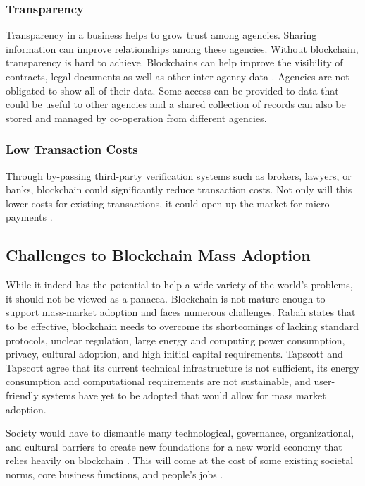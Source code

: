 \documentclass[sigconf]{acmart}
\begin{document}
\subsubsection{Transparency} Transparency in a business helps to grow trust among agencies. Sharing information can improve relationships among these agencies. Without blockchain, transparency is hard to achieve. Blockchains can help improve the visibility of contracts, legal documents as well as other inter-agency data \cite{pabc1}. Agencies are not obligated to show all of their data. Some access can be provided to data that could be useful to other agencies and a shared collection of records can also be stored and managed by co-operation from different agencies.

\subsubsection{Low Transaction Costs} Through by-passing third-party verification systems such as brokers, lawyers, or banks, blockchain could significantly reduce transaction costs. Not only will this lower costs for existing transactions, it could open up the market for micro-payments \cite{hbr}. 

\subsection{Challenges to Blockchain Mass Adoption}
While it indeed has the potential to help a wide variety of the world's problems, it should not be viewed as a panacea.  Blockchain is not mature enough to support mass-market adoption and faces numerous challenges. Rabah \cite{rabah2017overview} states that to be effective, blockchain needs to overcome its shortcomings of lacking standard protocols, unclear regulation, large energy and computing power consumption, privacy, cultural adoption, and high initial capital requirements. Tapscott and Tapscott \cite{tapscott} agree that its current technical infrastructure is not sufficient, its energy consumption and computational requirements are not sustainable, and user-friendly systems have yet to be adopted that would allow for mass market adoption.

Society would have to dismantle many technological, governance, organizational, and cultural barriers to create new foundations for a new world economy that relies heavily on blockchain \cite{hbr}. This will come at the cost of some existing societal norms, core business functions, and people's jobs \cite{hbr} \cite{rabah2017overview}. 
\end{document}
